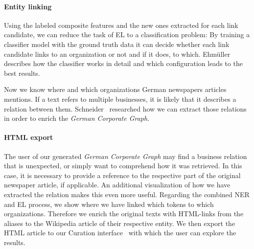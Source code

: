 \paragraph{Entity linking}
Using the labeled composite features and the new ones extracted for each link candidate, we can reduce the task of EL to a classification problem: By training a classifier model with the ground truth data it can decide whether each link candidate links to an organization or not and if it does, to which. Ehmüller~\cite{ehmueller} describes how the classifier works in detail and which configuration leads to the best results.

Now we know where and which organizations German newspapers articles mentions. If a text refers to multiple businesses, it is likely that it describes a relation between them. Schneider~\cite{schneider} researched how we can extract those relations in order to enrich the \textit{German Corporate Graph}.


\paragraph{HTML export}
The user of our generated \textit{German Corporate Graph} may find a business relation that is unexpected, or simply want to comprehend how it was retrieved. In this case, it is necessary to provide a reference to the respective part of the original newspaper article, if applicable. An additional visualization of how we have extracted the relation makes this even more useful. Regarding the combined NER and EL process, we show where we have linked which tokens to which organizations. Therefore we enrich the original texts with HTML-links from the aliases to the Wikipedia article of their respective entity. We then export the HTML article to our Curation interface~\cite{gruner} with which the user can explore the results.
